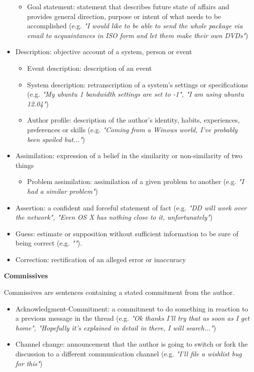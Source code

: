 \documentclass[11pt]{article}
\begin{document}
\begin{itemize}
\begin{itemize}
			\item Goal statement: statement that describes future state of affairs and provides general direction, purpose or intent of what needs to be accomplished (e.g. \textit{"I would like to be able to send the whole package via email to acquaintances in ISO form and let them make their own DVDs"})
		\end{itemize}
	\item Description: objective account of a system, person or event
		\begin{itemize}
			\item Event description: description of an event
			\item System description: retranscription of a system's settings or specifications (e.g. \textit{"My ubuntu 1 bandwidth settings are set to -1", "I am using ubuntu 12.04"})
			\item Author profile: description of the author's identity, habits, experiences, preferences or skills (e.g. \textit{"Coming from a Winows world, I've probably been spoiled but..."})
		\end{itemize}
	\item Assimilation: expression of a belief in the similarity or non-similarity of two things
		\begin{itemize}
			\item Problem assimilation: assimilation of a given problem to another (e.g. \textit{"I had a similar problem"})
		\end{itemize}
	\item Assertion: a confident and forceful statement of fact (e.g. \textit{"DD will work over the network", "Even OS X has nothing close to it, unfortunately"})
	\item Guess: estimate or supposition without sufficient information to be sure of being correct (e.g. \textit{""}).
	\item Correction: rectification of an alleged error or inaccuracy
\end{itemize}

\textbf{Commissives}
\vspace{0.1cm}

Commissives are sentences containing a stated commitment from the author.

\begin{itemize}
	\item Acknowledgment-Commitment: a commitment to do something in reaction to a previous message in the thread (e.g. \textit{"Ok thanks I'll try that as soon as I get home", "Hopefully it's explained in detail in there, I will search..."})
	\item Channel change: announcement that the author is going to switch or fork the discussion to a different communication channel (e.g. \textit{"I'll file a wishlist bug for this"})
\end{itemize}
\end{document}

